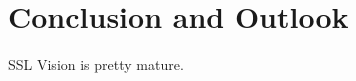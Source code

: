 
\clearpage
\section{Conclusion and Outlook}
\label{sec:conclusion}
SSL Vision is pretty mature.




\newpage \begin{appendices} 
\appendixtocon %

\appendixpage %

\subsection*{\listappendixname}
\listofappendices

\newpage

\begin{subappendices}
\renewcommand{\setthesubsection}{\arabic{subsection}:}%

\label{apx:code-template}


\end{subappendices}
\end{appendices}
